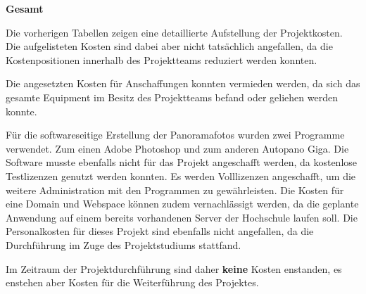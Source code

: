 
\textbf{Gesamt}


Die vorherigen Tabellen zeigen eine detaillierte Aufstellung der Projektkosten.
Die aufgelisteten Kosten sind dabei aber nicht tatsächlich angefallen, da die
Kostenpositionen innerhalb des Projektteams reduziert werden konnten.

Die angesetzten Kosten für Anschaffungen konnten vermieden werden, 
da sich das gesamte Equipment im Besitz des Projektteams befand oder 
geliehen werden konnte.

Für die softwareseitige Erstellung der Panoramafotos wurden
zwei Programme verwendet. Zum einen Adobe Photoshop und zum anderen Autopano Giga. 
Die Software musste ebenfalls nicht für das Projekt angeschafft werden, da kostenlose
Testlizenzen genutzt werden konnten. Es 
werden Volllizenzen angeschafft, um die weitere Administration mit den Programmen zu gewährleisten.
Die Kosten für eine Domain und Webspace können zudem vernachlässigt werden, da die geplante Anwendung auf einem bereits 
vorhandenen Server der Hochschule laufen soll.
Die Personalkosten für dieses Projekt sind ebenfalls nicht angefallen, da die Durchführung im Zuge des Projektstudiums 
stattfand.

Im Zeitraum der Projektdurchführung sind daher \textbf{keine} Kosten enstanden, es enstehen aber
Kosten für die Weiterführung des Projektes.
